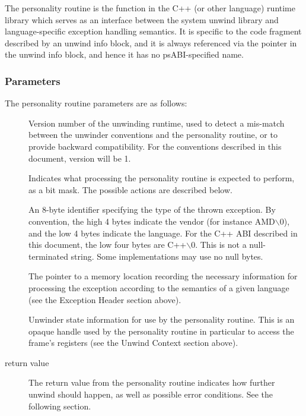 The personality routine is the function in the C++ (or other language)
runtime library which serves as an interface between the system
unwind library and language-specific exception handling semantics.
It is specific to the code fragment described by an unwind info block,
and it is always referenced via the pointer in the unwind info block,
and hence it has no psABI-specified name.

\subsubsection{Parameters}

The personality routine parameters are as follows:

\begin{description}
\item[] Version number of the unwinding runtime,
   used to detect a mis-match between the unwinder conventions and the
   personality routine, or to provide backward compatibility. For the
   conventions described in this document, version will be 1.
\item[] Indicates what processing the personality routine
   is expected to perform, as a bit mask. The possible actions are
   described below.
\item[] An 8-byte identifier specifying the type of the
   thrown exception. By convention, the high 4 bytes indicate the vendor
   (for instance AMD$\backslash$0), and the low 4 bytes indicate
   the language.  For the C++ ABI described in this document, the low
   four bytes are C++$\backslash$0.  This is not a null-terminated string.
   Some implementations may use no null bytes.
\item[] The pointer to a memory location recording the
   necessary information for processing the exception according to the
   semantics of a given language (see the Exception Header section above).
\item[] Unwinder state information for use by the personality routine.
   This is an opaque handle used by the personality routine in particular
   to access the frame's registers (see the Unwind Context section above).
\item[return value] The return value from the personality routine indicates
   how further unwind should happen, as well as possible error conditions.
   See the following section.
\end{description}

